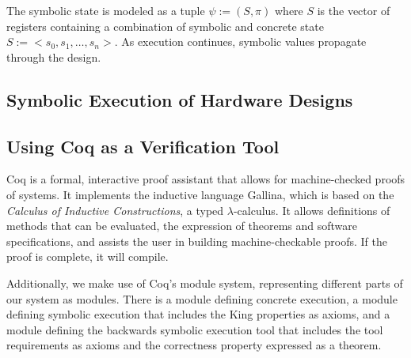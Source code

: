 The symbolic state is modeled as a tuple $\psi := (S,\pi)$ where $S$ is the
vector of registers containing a combination of symbolic and concrete state $S
:= <s_0, s_1, \ldots, s_n>$. As execution continues, symbolic values propagate
through the design.



\subsection{Symbolic Execution of Hardware Designs}

\subsection{Using Coq as a Verification Tool}
Coq is a formal, interactive proof assistant that allows for machine-checked proofs of systems. 
It implements the inductive language Gallina, which is based on the \textit{Calculus of Inductive Constructions}, a typed $\lambda$-calculus. It allows definitions of methods that can be evaluated, the expression of theorems and software specifications, and assists the user in building machine-checkable proofs. If the proof is complete, it will compile.



 

Additionally, we make use of Coq's module system, representing different parts of our system as modules.  There is a module defining concrete execution, a module defining symbolic execution that includes the King properties as axioms, and a module defining the backwards symbolic execution tool that includes the tool requirements as axioms and the correctness property expressed as a theorem.

